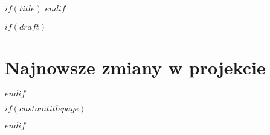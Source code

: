 $if(title)$
$endif$

$if(draft)$
\clearpage

\section*{Najnowsze zmiany w projekcie}
\thispagestyle{empty}
$endif$

$if(customtitlepage)$
\maketitle
$endif$

\makeinfo
\makeabstracts

\thispagestyle{empty}
\cleartooddpage
\tableofcontents

\cleartooddpage
